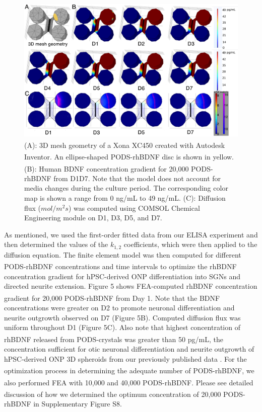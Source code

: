 \documentclass[review]{elsarticle}
\begin{document}
\begin{figure}
\begin{center}
	\includegraphics[width=13cm]{Fig_5.jpg}
\end{center}
\caption{(A): 3D mesh geometry of a Xona\textsuperscript{\texttrademark} XC450 created with Autodesk Inventor. An ellipse-shaped PODS\textsuperscript{\textregistered}-rhBDNF disc is shown in yellow. (B): Human BDNF concentration gradient for 20,000 PODS\textsuperscript{\textregistered}-rhBDNF from D1\textendash D7. Note that the model does not account for media changes during the culture period. The corresponding color map is shown a range from 0 ng/mL to 49 ng/mL. (C): Diffusion flux ($mol/m^{2}s$) was computed using COMSOL Chemical Engineering module on D1, D3, D5, and D7.}
\end{figure}

As mentioned, we used the first-order fitted data from our ELISA experiment and then determined the values of the $k_{1,2}$ coefficients, which were then applied to the diffusion equation. The finite element model was then computed for different PODS\textsuperscript{\textregistered}-rhBDNF concentrations and time intervals to optimize the rhBDNF concentration gradient for hPSC-derived ONP differentiation into SGNs and directed neurite extension. Figure 5 shows FEA-computed rhBDNF concentration gradient for 20,000 PODS\textsuperscript{\textregistered}-rhBDNF from Day 1. Note that the BDNF concentrations were greater on D2 to promote neuronal differentiation and neurite outgrowth observed on D7 (Figure 5B). Computed diffusion flux was uniform throughout D1 (Figure 5C). Also note that highest concentration of rhBDNF released from PODS\textsuperscript{\textregistered}-crystals was greater than 50 pg/mL, the concentration sufficient for otic neuronal differentiation and neurite outgrowth of hPSC-derived ONP 3D spheroids from our previously published data \cite{Chang2020}. For the optimization process in determining the adequate number of PODS\textsuperscript{\textregistered}-rhBDNF, we also performed FEA with 10,000 and 40,000 PODS\textsuperscript{\textregistered}-rhBDNF. Please see detailed discussion of how we determined the optimum concentration of 20,000 PODS\textsuperscript{\textregistered}-rhBDNF in Supplementary Figure S8. 
\end{document}
